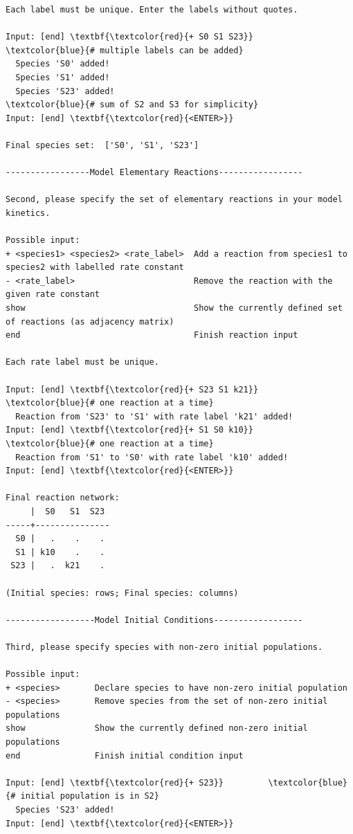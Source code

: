 \documentclass[a4paper,11pt,DIV=15,openany]{scrbook}
\begin{document}
\begin{oframed}
\begin{Verbatim}[commandchars=\\\{\}]
Each label must be unique. Enter the labels without quotes.

Input: [end] \textbf{\textcolor{red}{+ S0 S1 S23}}     \textcolor{blue}{# multiple labels can be added}
  Species 'S0' added!
  Species 'S1' added!
  Species 'S23' added!                                 \textcolor{blue}{# sum of S2 and S3 for simplicity}
Input: [end] \textbf{\textcolor{red}{<ENTER>}}

Final species set:  ['S0', 'S1', 'S23']

-----------------Model Elementary Reactions-----------------

Second, please specify the set of elementary reactions in your model kinetics.

Possible input:
+ <species1> <species2> <rate_label>  Add a reaction from species1 to species2 with labelled rate constant
- <rate_label>                        Remove the reaction with the given rate constant
show                                  Show the currently defined set of reactions (as adjacency matrix)
end                                   Finish reaction input

Each rate label must be unique.

Input: [end] \textbf{\textcolor{red}{+ S23 S1 k21}}    \textcolor{blue}{# one reaction at a time}
  Reaction from 'S23' to 'S1' with rate label 'k21' added!
Input: [end] \textbf{\textcolor{red}{+ S1 S0 k10}}     \textcolor{blue}{# one reaction at a time}
  Reaction from 'S1' to 'S0' with rate label 'k10' added!
Input: [end] \textbf{\textcolor{red}{<ENTER>}}

Final reaction network:
     |  S0   S1  S23 
-----+---------------
  S0 |   .    .    . 
  S1 | k10    .    . 
 S23 |   .  k21    . 

(Initial species: rows; Final species: columns)

------------------Model Initial Conditions------------------

Third, please specify species with non-zero initial populations.

Possible input:
+ <species>       Declare species to have non-zero initial population
- <species>       Remove species from the set of non-zero initial populations
show              Show the currently defined non-zero initial populations
end               Finish initial condition input

Input: [end] \textbf{\textcolor{red}{+ S23}}         \textcolor{blue}{# initial population is in S2}
  Species 'S23' added!
Input: [end] \textbf{\textcolor{red}{<ENTER>}}


\end{Verbatim}
\end{oframed}
\end{document}
